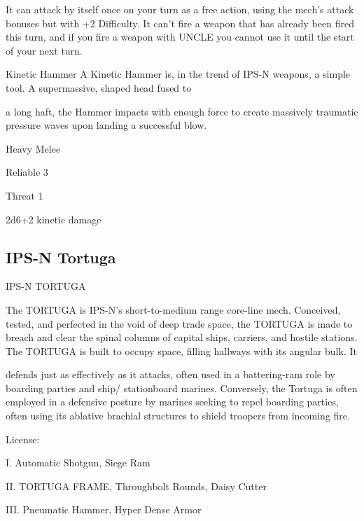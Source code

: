 It can attack by itself once on your turn as a free action, using the mech’s attack bonuses but  
with +2 Difficulty. It can’t fire a weapon that has already been fired this turn, and if you fire a  
weapon with UNCLE you cannot use it until the start of your next turn.
 

Kinetic Hammer  
A Kinetic Hammer is, in the trend of IPS-N weapons, a simple tool. A supermassive, shaped head fused to  

a long haft, the Hammer impacts with enough force to create massively traumatic pressure waves upon  
landing a successful blow.   

Heavy Melee
 
Reliable 3
 
Threat 1
 
2d6+2 kinetic damage  

                                                                                                                    


  \subsection{IPS-N Tortuga}

                                                   IPS-N TORTUGA  

The TORTUGA is IPS-N’s short-to-medium range core-line mech. Conceived, tested, and perfected in the  
void of deep trade space, the TORTUGA is made to breach and clear the spinal columns of capital ships,  
carriers, and hostile stations. The TORTUGA is built to occupy space, filling hallways with its angular bulk. It  

                                                                                                                               


defends just as effectively as it attacks, often used in a battering-ram role by boarding parties and ship/ 
stationboard marines. Conversely, the Tortuga is often employed in a defensive posture by marines seeking  
to repel boarding parties, often using its ablative brachial structures to shield troopers from incoming fire.     

                                                   License:
 
I. Automatic Shotgun, Siege Ram
 
II. TORTUGA FRAME, Throughbolt Rounds, Daisy Cutter
 
III. Pneumatic Hammer, Hyper Dense Armor
 

